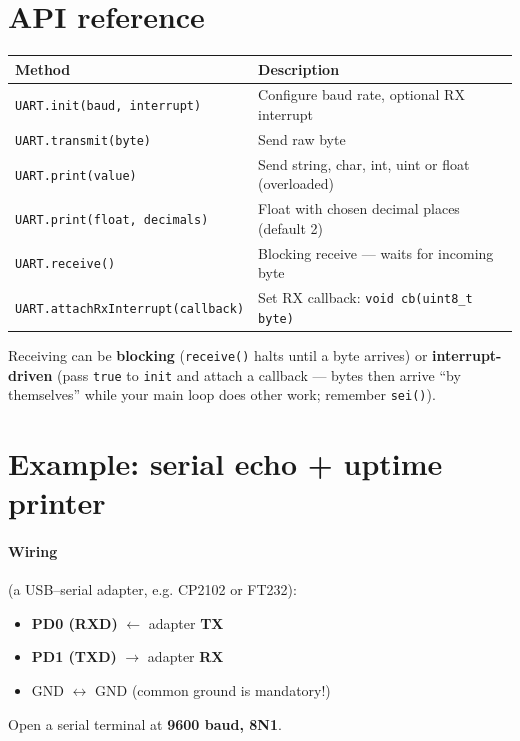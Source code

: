 \documentclass[11pt,a4paper]{article}
\begin{document}
\section{API reference}

\begin{center}
\small
\begin{tabular}{ll}
\toprule
\textbf{Method} & \textbf{Description} \\
\midrule
\texttt{UART.init(baud, interrupt)} & Configure baud rate, optional RX interrupt \\
\texttt{UART.transmit(byte)} & Send raw byte \\
\texttt{UART.print(value)} & Send string, char, int, uint or float (overloaded) \\
\texttt{UART.print(float, decimals)} & Float with chosen decimal places (default 2) \\
\texttt{UART.receive()} & Blocking receive --- waits for incoming byte \\
\texttt{UART.attachRxInterrupt(callback)} & Set RX callback: \texttt{void cb(uint8\_t byte)} \\
\bottomrule
\end{tabular}
\end{center}

Receiving can be \textbf{blocking} (\texttt{receive()} halts until a byte
arrives) or \textbf{interrupt-driven} (pass \texttt{true} to \texttt{init}
and attach a callback --- bytes then arrive ``by themselves'' while your main
loop does other work; remember \texttt{sei()}).

\section{Example: serial echo + uptime printer}

\paragraph{Wiring} (a USB--serial adapter, e.g. CP2102 or FT232):
\begin{itemize}
  \item \textbf{PD0 (RXD)} $\leftarrow$ adapter \textbf{TX}
  \item \textbf{PD1 (TXD)} $\rightarrow$ adapter \textbf{RX}
  \item GND $\leftrightarrow$ GND (common ground is mandatory!)
\end{itemize}
Open a serial terminal at \textbf{9600 baud, 8N1}.
\end{document}
